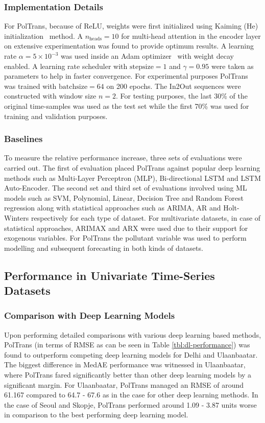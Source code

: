 \documentclass[10pt,journal]{IEEEtran}
\begin{document}
\subsubsection{Implementation Details}
For {PolTrans}, because of ReLU, weights were first initialized using Kaiming (He) initialization~\cite{He.2015} method. A ${n_{\text{heads}} = 10}$ for multi-head attention in the encoder layer on extensive experimentation was found to provide optimum results. A learning rate ${\alpha = 5 \times 10^{-3}}$ was used inside an Adam optimizer~\cite{Kingma.2014} with weight decay enabled. A learning rate scheduler with ${\mathrm{stepsize} = 1}$ and ${\gamma = 0.95}$ were taken as parameters to help in faster convergence. For experimental purposes {PolTrans} was trained with ${\mathrm{batchsize} = 64}$ on 200 epochs. The In2Out sequences were constructed with window size ${n = 2}$. For testing purposes, the last 30\% of the original time-samples was used as the test set while the first 70\% was used for training and validation purposes.

\subsubsection{Baselines}
To measure the relative performance increase, three sets of evaluations were carried out. The first of evaluation placed {PolTrans} against popular deep learning methods such as Multi-Layer Perceptron (MLP), Bi-directional LSTM and LSTM Auto-Encoder. The second set and third set of evaluations involved using ML models such as SVM, Polynomial, Linear, Decision Tree and Random Forest regression along with statistical approaches such as ARIMA, AR and Holt-Winters respectively for each type of dataset.
For multivariate datasets, in case of statistical approaches, ARIMAX and ARX were used due to their support for exogenous variables. For {PolTrans} the pollutant variable was used to perform modelling and subsequent forecasting in both kinds of datasets.

\subsection{Performance in Univariate Time-Series Datasets}

\subsubsection{Comparison with Deep Learning Models}

Upon performing detailed comparisons with various deep learning based methods, {PolTrans} (in terms of RMSE as can be seen in Table \ref{tbl:dl-performance}) was found to outperform competing deep learning models for Delhi and Ulaanbaatar. The biggest difference in MedAE performance was witnessed in Ulaanbaatar, where {PolTrans} fared significantly better than other deep learning models by a significant margin. For Ulaanbaatar, {PolTrans} managed an RMSE of around 61.167 compared to 64.7 - 67.6 as in the case for other deep learning methods. In the case of Seoul and Skopje, {PolTrans} performed around 1.09 - 3.87 units worse in comparison to the best performing deep learning model.
\end{document}

